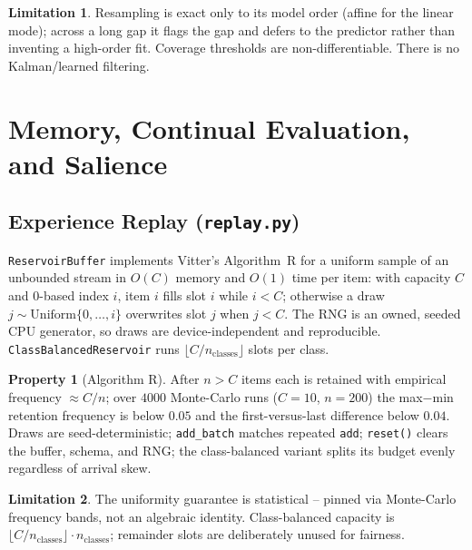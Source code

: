 \documentclass[11pt]{article}
\theoremstyle{definition}
\newtheorem{property}{Property}[section]
\newtheorem{limitation}{Limitation}[section]
\newcommand{\code}[1]{\texttt{#1}}
\begin{document}
\begin{limitation}
Resampling is exact only to its model order (affine for the linear mode);
across a long gap it flags the gap and defers to the predictor rather than
inventing a high-order fit. Coverage thresholds are non-differentiable.
There is no Kalman/learned filtering.
\end{limitation}

\section{Memory, Continual Evaluation, and Salience}\label{sec:memory}

\subsection{Experience Replay (\code{replay.py})}
\code{ReservoirBuffer} implements Vitter's Algorithm~R for a uniform sample
of an unbounded stream in $O(C)$ memory and $O(1)$ time per item: with
capacity $C$ and 0-based index $i$, item $i$ fills slot $i$ while $i<C$;
otherwise a draw $j\sim\mathrm{Uniform}\{0,\dots,i\}$ overwrites slot $j$
when $j<C$. The RNG is an owned, seeded CPU generator, so draws are
device-independent and reproducible. \code{ClassBalancedReservoir} runs
$\lfloor C/n_{\text{classes}}\rfloor$ slots per class.

\begin{property}[Algorithm R]
After $n>C$ items each is retained with empirical frequency $\approx C/n$;
over $4000$ Monte-Carlo runs ($C=10$, $n=200$) the max$-$min retention
frequency is below $0.05$ and the first-versus-last difference below $0.04$.
Draws are seed-deterministic; \code{add\_batch} matches repeated \code{add};
\code{reset()} clears the buffer, schema, and RNG; the class-balanced variant
splits its budget evenly regardless of arrival skew.
\end{property}

\begin{limitation}
The uniformity guarantee is statistical -- pinned via Monte-Carlo frequency
bands, not an algebraic identity. Class-balanced capacity is
$\lfloor C/n_{\text{classes}}\rfloor\cdot n_{\text{classes}}$; remainder
slots are deliberately unused for fairness.
\end{limitation}
\end{document}
